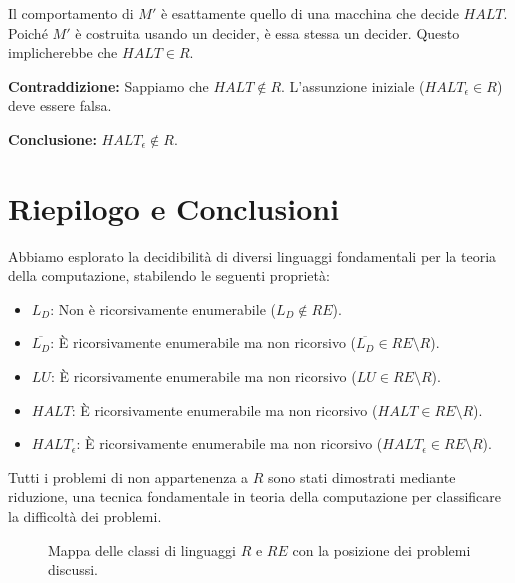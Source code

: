 \documentclass[a4paper]{article}
\makeatletter
\renewenvironment{proof}[1][\proofname]{\par
  \pushQED{\qed}%
  \normalfont \topsep6\p@\@plus6\p@\relax
  \trivlist
  \item[\hskip\labelsep
        \bfseries
    #1\@addpunct{.}]\ignorespaces
}{%
  \popQED\endtrivlist\@endpefalse
}
\makeatother
\begin{document}
\begin{proof}
Il comportamento di $M'$ è esattamente quello di una macchina che decide $HALT$. Poiché $M'$ è costruita usando un decider, è essa stessa un decider. Questo implicherebbe che $HALT \in R$.

\textbf{Contraddizione:} Sappiamo che $HALT \notin R$.
L'assunzione iniziale ($HALT_\epsilon \in R$) deve essere falsa.

\textbf{Conclusione:} $HALT_\epsilon \notin R$.
\end{proof}

\section{Riepilogo e Conclusioni}
Abbiamo esplorato la decidibilità di diversi linguaggi fondamentali per la teoria della computazione, stabilendo le seguenti proprietà:
\begin{itemize}
    \item $L_D$: Non è ricorsivamente enumerabile ($L_D \notin RE$).
    \item $\overline{L_D}$: È ricorsivamente enumerabile ma non ricorsivo ($\overline{L_D} \in RE \setminus R$).
    \item $LU$: È ricorsivamente enumerabile ma non ricorsivo ($LU \in RE \setminus R$).
    \item $HALT$: È ricorsivamente enumerabile ma non ricorsivo ($HALT \in RE \setminus R$).
    \item $HALT_\epsilon$: È ricorsivamente enumerabile ma non ricorsivo ($HALT_\epsilon \in RE \setminus R$).
\end{itemize}
Tutti i problemi di non appartenenza a $R$ sono stati dimostrati mediante riduzione, una tecnica fondamentale in teoria della computazione per classificare la difficoltà dei problemi.

\begin{figure}[h!]
    \centering
    \caption{Mappa delle classi di linguaggi $R$ e $RE$ con la posizione dei problemi discussi.}
    \label{fig:r_re_map_updated}
\end{figure}
\end{document}
